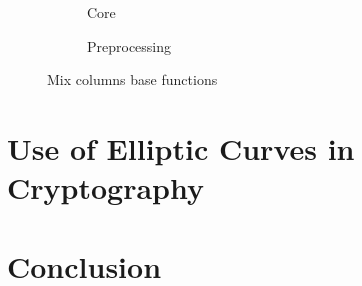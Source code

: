 \documentclass{article}
\begin{document}
\begin{figure}[H]
\centering
\begin{subfigure}{.54\textwidth}
  \centering
  \caption{Core}
  \label{fig:core}
\end{subfigure}
\begin{subfigure}{.35\textwidth}
  \centering
  \caption{Preprocessing}
  \label{fig:preprocessing}
\end{subfigure}
\caption{Mix columns base functions}
\label{fig:MixColumns}
\end{figure}
 

\section{Use of Elliptic Curves in Cryptography}



\section{Conclusion}






%

\end{document}
